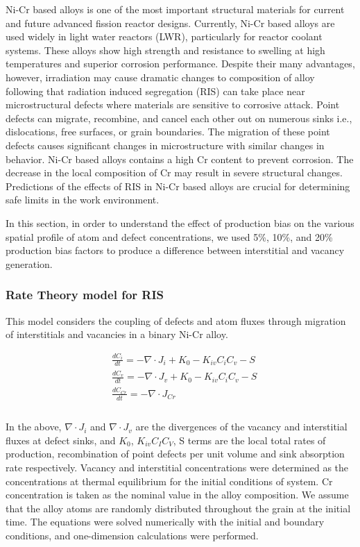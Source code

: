 \documentclass[a4paper]{article}
\begin{document}
    Ni-Cr based alloys is one of the most important structural materials for current and future advanced fission reactor designs. Currently, Ni-Cr based alloys are used widely in light water reactors (LWR), particularly for reactor coolant systems. These alloys show high strength and resistance to swelling at high temperatures and superior corrosion performance. Despite their many advantages, however, irradiation may cause dramatic changes to composition of alloy following that radiation induced segregation (RIS) can take place near microstructural defects where materials are sensitive to corrosive attack. Point defects can migrate, recombine, and cancel each other out on numerous sinks i.e., dislocations, free surfaces, or grain boundaries. The migration of these point defects causes significant changes in microstructure with similar changes in behavior. Ni-Cr based alloys contains a high Cr content to prevent corrosion. The decrease in the local composition of Cr may result in severe structural changes. Predictions of the effects of RIS in Ni-Cr based alloys are crucial for determining safe limits in the work environment.

    In this section, in order to understand the effect of production bias on the various spatial profile of atom and defect concentrations, we used 5\%, 10\%, and 20\% production bias factors to produce a difference between interstitial and vacancy generation.

    \subsubsection{Rate Theory model for RIS} \hspace{10pt}

    This model considers the coupling of defects and atom fluxes through migration of interstitials and vacancies in a binary Ni-Cr alloy.

    \begin{equation}
        \begin{aligned}
        &\frac{dC_i}{dt} = - \nabla\cdot J_i + K_0 - K_{iv}C_iC_v - S \\
        &\frac{dC_v}{dt} = - \nabla\cdot J_v + K_0 - K_{iv}C_iC_v - S\\
        &\frac{dC_{Cr}}{dt} = - \nabla\cdot J_{Cr} \\
        \end{aligned}
        \label{equation:RIS_equations}
     \end{equation}\\
    In the above, $\nabla\cdot J_i$ and $\nabla\cdot J_v$ are the divergences of the vacancy and interstitial fluxes at defect sinks, and $K_0$, $K_{iv}C_IC_V$, S terms are the local total rates of production, recombination of point defects per unit volume and sink absorption rate respectively.
    Vacancy and interstitial concentrations were determined as the concentrations at thermal equilibrium for the initial conditions of system. Cr concentration is taken as the nominal value in the alloy composition. We assume that the alloy atoms are randomly distributed throughout the grain at the initial time. The equations were solved numerically with the initial and boundary conditions, and one-dimension calculations were performed.
\end{document}
